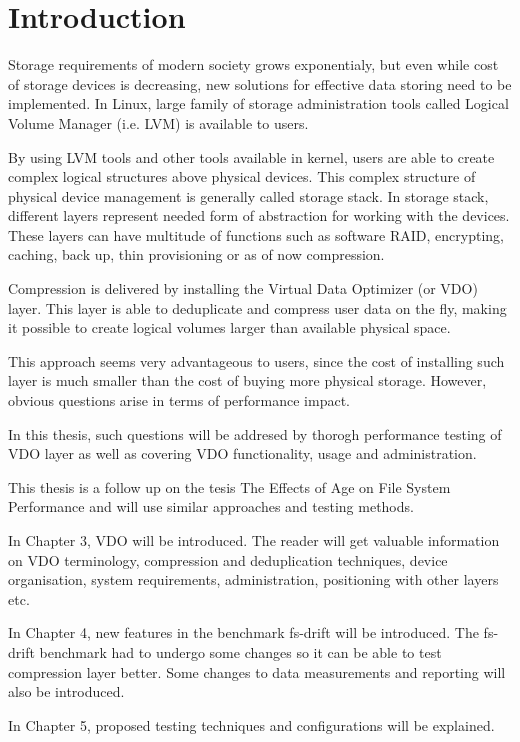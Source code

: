 \documentclass[
  color, %
  table, %
  lof,   %
  lot,   %
]{fithesis3}
\begin{document}
\chapter{Introduction}
Storage requirements of modern society grows exponentialy, but even while cost of storage devices is decreasing, new solutions for effective data storing need to be implemented. In Linux, large family of storage administration tools called Logical Volume Manager (i.e. LVM) is available to users.

By using LVM tools and other tools available in kernel, users are able to create complex logical structures above physical devices. This complex structure of physical device management is generally called storage stack. In storage stack, different layers represent needed form of abstraction for working with the devices. These layers can have multitude of functions such as software RAID, encrypting, caching, back up, thin provisioning or as of now compression.

Compression is delivered by installing the Virtual Data Optimizer (or VDO) layer. This layer is able to deduplicate and compress user data on the fly, making it possible to create logical volumes larger than available physical space.

This approach seems very advantageous to users, since the cost of installing such layer is much smaller than the cost of buying more physical storage. However, obvious questions arise in terms of performance impact.

In this thesis, such questions will be addresed by thorogh performance testing of VDO layer as well as covering VDO functionality, usage and administration.

This thesis is a follow up on the tesis The Effects of Age on File System Performance and will use similar approaches and testing methods.

In Chapter 3, VDO will be introduced. The reader will get valuable information on VDO terminology, compression and deduplication techniques, device organisation, system requirements, administration, positioning with other layers etc.

In Chapter 4, new features in the benchmark fs-drift will be introduced. The fs-drift benchmark had to undergo some changes so it can be able to test compression layer better. Some changes to data measurements and reporting will also be introduced.

In Chapter 5, proposed testing techniques and configurations will be explained.
\end{document}
